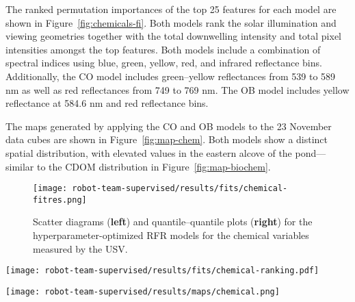 The ranked permutation importances of the top 25 features for each model are shown in Figure~\ref{fig:chemicals-fi}. Both models rank the solar illumination and viewing geometries together with the total downwelling intensity and total pixel intensities amongst the top features. Both models include a combination of spectral indices using blue, green, yellow, red, and infrared reflectance bins. Additionally, the CO model includes green--yellow reflectances from 539 to 589 nm as well as red reflectances from 749 to 769 nm. The OB model includes yellow reflectance at 584.6 nm and red reflectance bins.

The maps generated by applying the CO and OB models to the 23 November data cubes are shown in Figure~\ref{fig:map-chem}. Both models show a distinct spatial distribution, with elevated values in the eastern alcove of the pond---similar to the CDOM distribution in Figure~\ref{fig:map-biochem}.


\newpage

\begin{figure}[H]
  \centering
  \texttt{[image: robot-team-supervised/results/fits/chemical-fitres.png]}
\vspace{-0.11in}
\caption{Scatter diagrams (\textbf{left}) and quantile--quantile plots (\textbf{right}) for the hyperparameter-optimized RFR models for the chemical variables measured by the USV.\label{fig:chemicals-fit}}
\end{figure}

\begin{sidewaysfigure}
  \centering
  \texttt{[image: robot-team-supervised/results/fits/chemical-ranking.pdf]}
  \caption{Ranked permutation importance for the top 25 features of the chemical
    models. The permutation importance measures the decrease in the model's
    $R^2$ value after replacing each feature in the prediction set with a random
    permutation of its values.\label{fig:chemicals-fi}}
\end{sidewaysfigure}

\begin{sidewaysfigure}
  \texttt{[image: robot-team-supervised/results/maps/chemical.png]}
  \caption{Maps generated by applying the trained chemical variable models to
    the hyperspectral data cubes collected on 23 November. Overlaid are
    color-filled squares showing the in situ reference data for the same
    collection period. The size of the squares is exaggerated for the
    visualization. We note that there is good agreement between the model
    predictions and reference data.\label{fig:map-chem}}
\end{sidewaysfigure}

